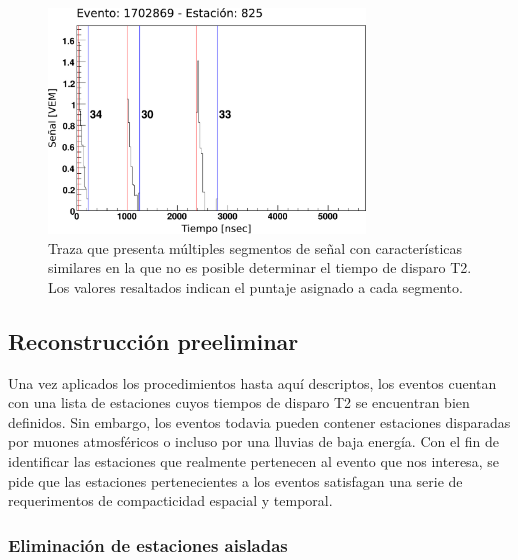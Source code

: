 		\begin{figure}[ht]
			\begin{center}
			\includegraphics[width=0.75\textwidth]{fig/seleccionAuger/multipicos.pdf}
			\caption{Traza que presenta múltiples segmentos de señal con características similares en la que no es posible determinar el tiempo de disparo T2. Los valores resaltados indican el puntaje asignado a cada segmento.}
			\label{fig:multipicos}
			\end{center}
		\end{figure}
		
		
	\subsection{Reconstrucción preeliminar}
	
	Una vez aplicados los procedimientos hasta aquí descriptos, los eventos cuentan con una lista de estaciones cuyos tiempos de disparo T2 se encuentran bien definidos.
	Sin embargo, los eventos todavia pueden contener estaciones disparadas por muones atmosféricos o incluso por una lluvias de baja energía.
	Con el fin de identificar las estaciones que realmente pertenecen al evento que nos interesa, se pide que las estaciones pertenecientes a los eventos satisfagan una serie de requerimentos de compacticidad espacial y temporal.
	
	\subsubsection{Eliminación de estaciones aisladas} 
	
